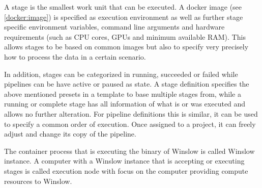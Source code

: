 A stage is the smallest work unit that can be executed.
A docker image (see \autoref{docker:image}) is specified as execution environment as well as further stage specific environment variables, command line arguments and hardware requirements (such as CPU cores, GPUs and minimum available RAM).
This allows stages to be based on common images but also to specify very precisely how to process the data in a certain scenario.

In addition, stages can be categorized in running, succeeded or failed while pipelines can be have active or paused as state.
A stage definition specifies the above mentioned presets in a template to base multiple stages from, while a running or complete stage has all information of what is or was executed and allows no further alteration.
For pipeline definitions this is similar, it can be used to specify a common order of execution.
Once assigned to a project, it can freely adjust and change its copy of the pipeline.

The container process that is executing the binary of Winslow is called Winslow instance.
A computer with a Winslow instance that is accepting or executing stages is called execution node with focus on the computer providing compute resources to Winslow.

